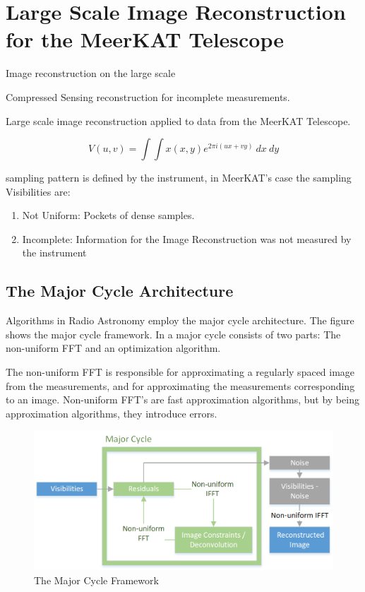 \section{Large Scale Image Reconstruction for the MeerKAT Telescope} \label{intro}
Image reconstruction on the large scale

Compressed Sensing reconstruction for incomplete measurements.

Large scale image reconstruction applied to data from the MeerKAT Telescope.

\begin{equation}\label{intro:measurement}
V(u, v) = \int\int x(x, y) e^{2 \pi i (ux+vy)} \: dx \: dy 
\end{equation}

sampling pattern is defined by the instrument, in MeerKAT's case the sampling Visibilities are:
\begin{enumerate}
	\item Not Uniform: Pockets of dense samples.
	\item Incomplete: Information for the Image Reconstruction was not measured by the instrument
\end{enumerate}


\subsection{The Major Cycle Architecture}
Algorithms in Radio Astronomy employ the major cycle architecture. The figure shows the major cycle framework. In a major cycle consists of two parts: The non-uniform FFT and an optimization algorithm. 

The non-uniform FFT is responsible for approximating a regularly spaced image from the measurements, and for approximating the measurements corresponding to an image. Non-uniform FFT's are fast approximation algorithms, but by being approximation algorithms, they introduce errors. 

\begin{figure}
	\centering
	\vspace{-10pt}
	\includegraphics[width=1.0\linewidth]{./chapters/01.intro/Major-Minor.png}
	\caption{The Major Cycle Framework}
	\label{intro:major}
	\vspace{-10pt}
\end{figure}

